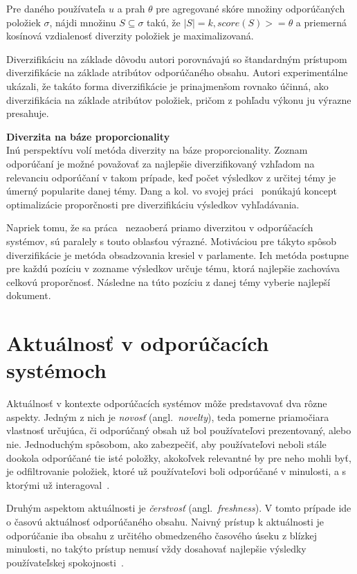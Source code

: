 \begin{adjustwidth}{1cm}{1cm}
Pre daného používateľa $u$ a prah $\theta$ pre agregované skóre množiny odporúčaných položiek $\sigma$, nájdi množinu
$S \subseteq \sigma$ takú, že $|S| = k, score(S) >= \theta$ a priemerná kosínová vzdialenosť diverzity položiek je maximalizovaná.
\end{adjustwidth}

Diverzifikáciu na základe dôvodu autori porovnávajú so štandardným prístupom diverzifikácie na základe atribútov odporúčaného obsahu.
Autori experimentálne ukázali, že takáto forma diverzifikácie je prinajmenšom rovnako účinná, ako diverzifikácia na
základe atribútov položiek, pričom z pohľadu výkonu ju výrazne presahuje.

\textbf{Diverzita na báze proporcionality}\\
Inú perspektívu volí metóda diverzity na báze proporcionality. Zoznam odporúčaní je možné považovať za najlepšie diverzifikovaný
vzhľadom na relevanciu odporúčaní v takom prípade, keď počet výsledkov z určitej témy je úmerný popularite danej témy.
Dang a kol. vo svojej práci~\cite{Dang2012} ponúkajú koncept optimalizácie proporčnosti pre diverzifikáciu výsledkov
vyhľadávania.

Napriek tomu, že sa práca~\cite{Dang2012} nezaoberá priamo diverzitou v odporúčacích systémov, sú paralely s touto
oblasťou výrazné. Motiváciou pre tákyto spôsob diverzifikácie je metóda obsadzovania kresiel v parlamente. Ich metóda
postupne pre každú pozíciu v zozname výsledkov určuje tému, ktorá najlepšie zachováva celkovú proporčnosť. Následne
na túto pozíciu z danej témy vyberie najlepší dokument.


\section{Aktuálnosť v odporúčacích systémoch}

Aktuálnosť v kontexte odporúčacích systémov môže predstavovať dva rôzne aspekty. Jedným z nich je \emph{novosť}
(angl.~\emph{novelty}), teda pomerne priamočiara vlastnosť určujúca, či odporúčaný obsah už bol používateľovi prezentovaný,
alebo nie. Jednoduchým spôsobom, ako zabezpečiť, aby používateľovi neboli stále dookola odporúčané tie isté položky,
akokoľvek relevantné by pre neho mohli byť, je odfiltrovanie položiek, ktoré už používateľovi boli odporúčané v minulosti,
a s ktorými už interagoval~\cite{Handbook2011}.

Druhým aspektom aktuálnosti je \emph{čerstvosť} (angl.~\emph{freshness}). V tomto prípade ide o časovú aktuálnosť odporúčaného
obsahu. Naivný prístup k aktuálnosti je odporúčanie iba obsahu z určitého obmedzeného časového úseku z blízkej minulosti,
no takýto prístup nemusí vždy dosahovať najlepšie výsledky používateľskej spokojnosti~\cite{Szpektor2013}.

